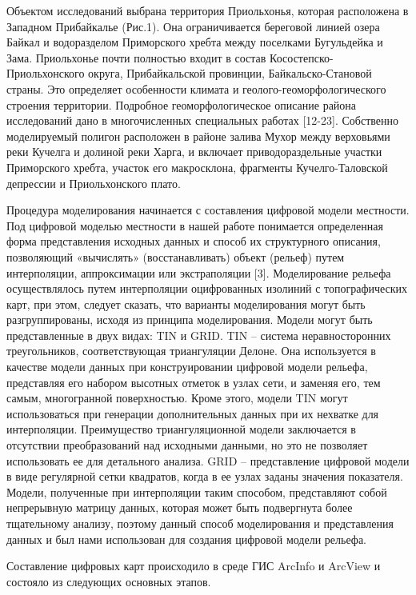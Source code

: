 \documentclass[runningheads]{AIIT}
\begin{document}
Объектом исследований выбрана территория Приольхонья, которая расположена в Западном Прибайкалье (Рис.1). Она ограничивается береговой линией озера Байкал и водоразделом Приморского хребта между поселками Бугульдейка и Зама. Приольхонье почти полностью входит в состав Косостепско-Приольхонского округа, Прибайкальской провинции, Байкальско-Становой страны. Это определяет особенности климата и геолого-геоморфологического строения территории. Подробное геоморфологическое описание района исследований дано в многочисленных специальных работах [12-23]. Собственно моделируемый полигон расположен в районе залива Мухор между верховьями реки Кучелга и долиной реки Харга, и включает приводораздельные участки Приморского хребта, участок его макросклона, фрагменты Кучелго-Таловской депрессии и Приольхонского плато.


Процедура моделирования начинается с составления цифровой модели местности. Под цифровой моделью местности в нашей работе понимается определенная форма представления исходных данных и способ их структурного описания, позволяющий «вычислять» (восстанавливать) объект (рельеф) путем интерполяции, аппроксимации или экстраполяции [3]. Моделирование рельефа осуществлялось путем интерполяции оцифрованных изолиний с топографических карт, при этом, следует сказать, что варианты моделирования могут быть разгруппированы, исходя из принципа моделирования. Модели могут быть представленные в двух видах: TIN и GRID.
TIN – система неравносторонних треугольников, соответствующая триангуляции Делоне. Она используется в качестве модели данных при конструировании цифровой модели рельефа, представляя его набором высотных отметок в узлах сети, и заменяя его, тем самым, многогранной поверхностью. Кроме этого, модели TIN могут использоваться при генерации дополнительных данных при их нехватке для интерполяции. Преимущество триангуляционной модели заключается в отсутствии преобразований над исходными данными, но это не позволяет использовать ее для детального анализа.
GRID – представление цифровой модели в виде регулярной сетки квадратов, когда в ее узлах заданы значения показателя. Модели, полученные при интерполяции таким способом, представляют собой непрерывную матрицу данных, которая может быть подвергнута более тщательному анализу, поэтому данный способ моделирования и представления данных и был нами использован для создания цифровой модели рельефа.

Составление цифровых карт происходило в среде ГИС ArcInfo и ArcView и состояло из следующих основных этапов.
\end{document}

